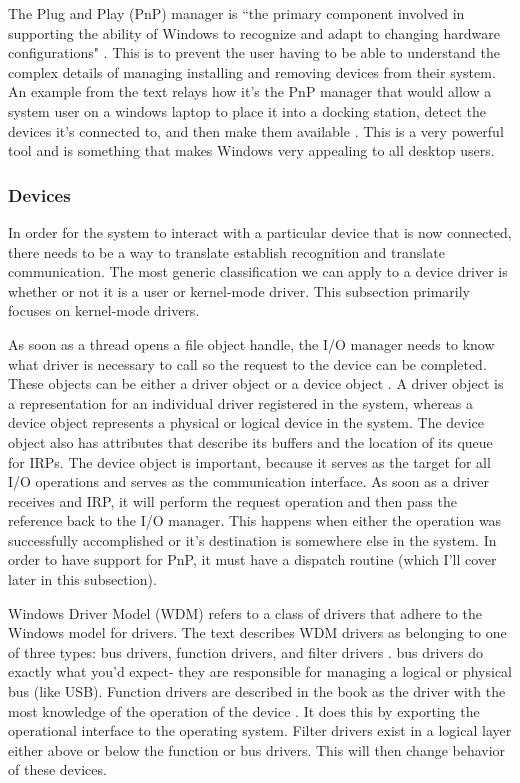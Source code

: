 \documentclass[10pt,draftclsnofoot,onecolumn]{IEEEtran}
\begin{document}
\par The Plug and Play (PnP) manager is ``the primary component involved in supporting the ability of Windows to recognize and adapt to changing hardware configurations" \cite{win:2}.
This is to prevent the user having to be able to understand the complex details of managing installing and removing devices from their system.
An example from the text relays how it's the PnP manager that would allow a system user on a windows laptop to place it into a docking station, detect the devices it's connected to, and then make them available \cite{win:2}.
This is a very powerful tool and is something that makes Windows very appealing to all desktop users.

\subsubsection{Devices}
\label{sub:Devices Windows}
\par In order for the system to interact with a particular device that is now connected, there needs to be a way to translate establish recognition and translate communication.
The most generic classification we can apply to a device driver is whether or not it is a user or kernel-mode driver.
This subsection primarily focuses on kernel-mode drivers.

\par As soon as a thread opens a file object handle, the I/O manager needs to know what driver is necessary to call so the request to the device can be completed.
These objects can be either a driver object or a device object \cite{win:2}.
A driver object is a representation for an individual driver registered in the system, whereas a device object represents a physical or logical device in the system.
The device object also has attributes that describe its buffers and the location of its queue for IRPs.
The device object is important, because it serves as the target for all I/O operations and serves as the communication interface.
As soon as a driver receives and IRP, it will perform the request operation and then pass the reference back to the I/O manager.
This happens when either the operation was successfully accomplished or it's destination is somewhere else in the system.
In order to have support for PnP, it must have a dispatch routine (which I'll cover later in this subsection).

\par Windows Driver Model (WDM) refers to a class of drivers that adhere to the Windows model for drivers.
The text describes WDM drivers as belonging to one of three types: bus drivers, function drivers, and filter drivers \cite{win:2}.
bus drivers do exactly what you'd expect- they are responsible for managing a logical or physical bus (like USB).
Function drivers are described in the book as the driver with the most knowledge of the operation of the device \cite{win:2}.
It does this by exporting the operational interface to the operating system.
Filter drivers exist in a logical layer either above or below the function or bus drivers.
This will then change behavior of these devices.
\end{document}

